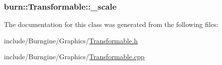 \hypertarget{classburn_1_1_transformable_a80e5ca4d02b2d58593b751b040e86492}{
\subsubsection[{\-\_\-scale}]{ burn\-::\-Transformable\-::\-\_\-scale\hspace{0.3cm}{\ttfamily [protected]}}}\label{classburn_1_1_transformable_a80e5ca4d02b2d58593b751b040e86492}


The documentation for this class was generated from the following files\-:\begin{DoxyCompactItemize}
\item 
include/\-Burngine/\-Graphics/\hyperlink{_transformable_8h}{Transformable.\-h}\item 
include/\-Burngine/\-Graphics/\hyperlink{_transformable_8cpp}{Transformable.\-cpp}\end{DoxyCompactItemize}

